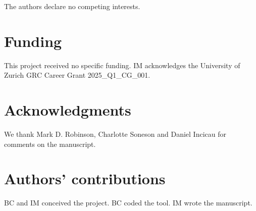 \documentclass[10pt]{article}
\begin{document}
The authors declare no competing interests.

\section*{Funding}

This project received no specific funding. IM acknowledges the University of Zurich GRC Career Grant 2025\_Q1\_CG\_001.

\section*{Acknowledgments}

We thank Mark D. Robinson, Charlotte Soneson and Daniel Incicau for comments on the manuscript.

\section*{Authors' contributions}

BC and IM conceived the project. BC coded the tool. IM wrote the manuscript.


%
\end{document}
